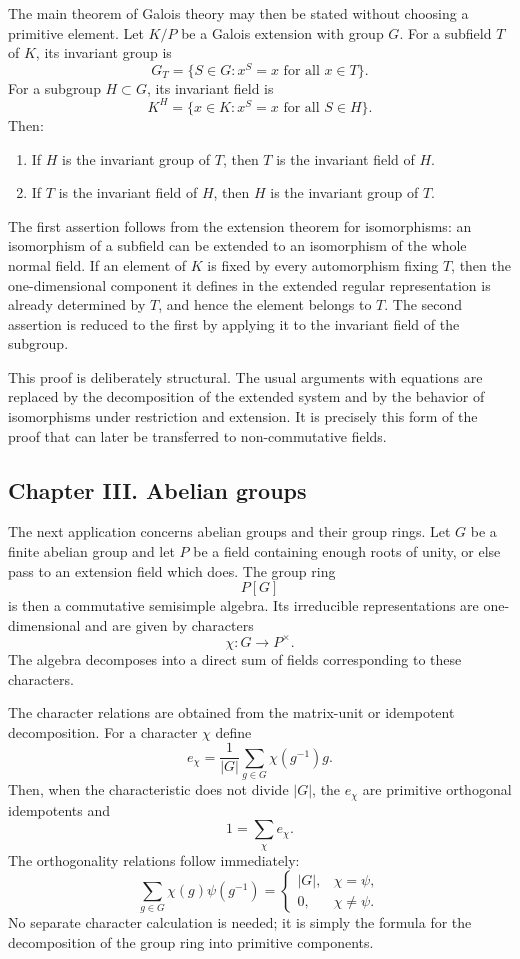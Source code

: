 \documentclass[11pt]{article}
\begin{document}
The main theorem of Galois theory may then be stated without choosing a primitive element. Let \(K/P\) be a Galois extension with group \(G\). For a subfield \(T\) of \(K\), its invariant group is
\[
  G_T=\{S\in G: x^S=x\text{ for all }x\in T\}.
\]
For a subgroup \(H\subset G\), its invariant field is
\[
  K^H=\{x\in K: x^S=x\text{ for all }S\in H\}.
\]
Then:
\begin{enumerate}[label=\arabic*.]
\item If \(H\) is the invariant group of \(T\), then \(T\) is the invariant field of \(H\).
\item If \(T\) is the invariant field of \(H\), then \(H\) is the invariant group of \(T\).
\end{enumerate}
The first assertion follows from the extension theorem for isomorphisms: an isomorphism of a subfield can be extended to an isomorphism of the whole normal field. If an element of \(K\) is fixed by every automorphism fixing \(T\), then the one-dimensional component it defines in the extended regular representation is already determined by \(T\), and hence the element belongs to \(T\). The second assertion is reduced to the first by applying it to the invariant field of the subgroup.

This proof is deliberately structural. The usual arguments with equations are replaced by the decomposition of the extended system and by the behavior of isomorphisms under restriction and extension. It is precisely this form of the proof that can later be transferred to non-commutative fields.

\subsection{Chapter III. Abelian groups}

The next application concerns abelian groups and their group rings. Let \(G\) be a finite abelian group and let \(P\) be a field containing enough roots of unity, or else pass to an extension field which does. The group ring
\[
  P[G]
\]
is then a commutative semisimple algebra. Its irreducible representations are one-dimensional and are given by characters
\[
  \chi:G\longrightarrow P^{\times}.
\]
The algebra decomposes into a direct sum of fields corresponding to these characters.

The character relations are obtained from the matrix-unit or idempotent decomposition. For a character \(\chi\) define
\[
  e_\chi=\frac1{|G|}\sum_{g\in G}\chi(g^{-1})g.
\]
Then, when the characteristic does not divide \(|G|\), the \(e_\chi\) are primitive orthogonal idempotents and
\[
  1=\sum_\chi e_\chi.
\]
The orthogonality relations follow immediately:
\[
  \sum_{g\in G}\chi(g)\psi(g^{-1})=
  \begin{cases}
  |G|,&\chi=\psi,\\
  0,&\chi\ne\psi.
  \end{cases}
\]
No separate character calculation is needed; it is simply the formula for the decomposition of the group ring into primitive components.
\end{document}
